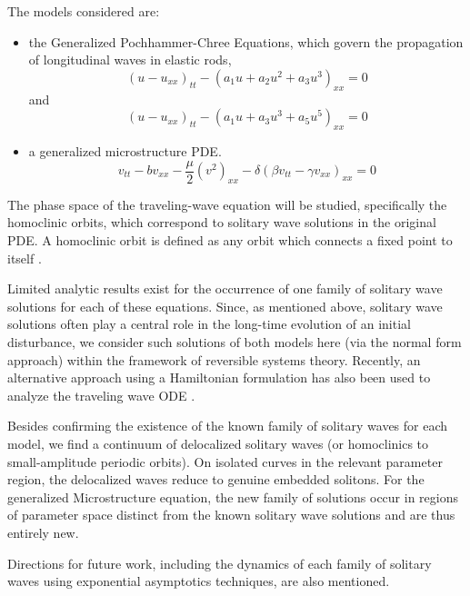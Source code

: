 The models considered are:
\begin{itemize}
\item the Generalized Pochhammer-Chree Equations, which  govern the
propagation of longitudinal waves in elastic rods,
\begin{equation}\label{eq:GPC1}
\left( u - u_{xx} \right)_{tt} - \left( a_1 u + a_2 u^2 + a_3 u^3 \right)_{xx} =0  
\end{equation}
and
\begin{equation}  \label{eq:GPC2} 
\left( u - u_{xx} \right)_{tt} - \left( a_1 u + a_3 u^3 + a_5 u^5 \right)_{xx} =0
\end{equation}

\item a generalized microstructure PDE.
\begin{equation}\label{eq:MS}
v_{tt} - b v_{xx} - \frac{\mu}{2} \left( v^2 \right)_{xx} - \delta \left( \beta v_{tt} - \gamma v_{xx}\right)_{xx} = 0 
\end{equation}
\end{itemize}

The phase space of the traveling-wave equation will be studied, specifically 
the homoclinic orbits, which correspond to solitary wave solutions in the original
PDE. A homoclinic orbit is defined as any orbit which connects a fixed point to itself 
\cite{Strogatz}.

Limited analytic results exist for the occurrence of one family
of  solitary wave solutions for each of these equations. Since, as
mentioned above, solitary wave solutions often play a central role in
the long-time evolution of an initial disturbance, we consider
such solutions of both models here (via the normal form approach)
within the framework of reversible systems theory. Recently, an
alternative approach using a Hamiltonian formulation has also
been used to analyze the traveling wave ODE \cite{LiZhang}.

Besides confirming
the existence of the known family of solitary waves for each model,
we find a continuum of delocalized solitary waves
(or homoclinics to small-amplitude periodic orbits).
On isolated curves in the relevant parameter region, the delocalized
waves reduce to genuine embedded solitons.
For the generalized Microstructure equation, the new family of solutions occur in regions of
parameter space distinct from the known solitary wave solutions and
are thus entirely new.

Directions for future work, including the dynamics of each family of
solitary waves using exponential asymptotics techniques, are also mentioned.


